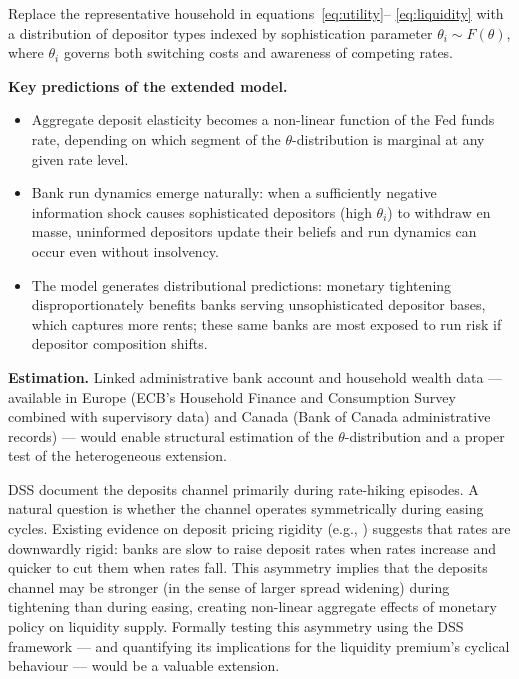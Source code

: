 \documentclass[12pt,a4paper]{article}
\begin{document}
\begin{extbox}
Replace the representative household in equations~\eqref{eq:utility}--
\eqref{eq:liquidity} with a distribution of depositor types indexed by
sophistication parameter $\theta_i \sim F(\theta)$, where $\theta_i$ governs
both switching costs and awareness of competing rates.

\textbf{Key predictions of the extended model.}
\begin{itemize}
  \item Aggregate deposit elasticity becomes a non-linear function of the Fed
    funds rate, depending on which segment of the $\theta$-distribution is
    marginal at any given rate level.
  \item Bank run dynamics emerge naturally: when a sufficiently negative
    information shock causes sophisticated depositors (high $\theta_i$) to
    withdraw en masse, uninformed depositors update their beliefs and run
    dynamics can occur even without insolvency.
  \item The model generates distributional predictions: monetary tightening
    disproportionately benefits banks serving unsophisticated depositor bases,
    which captures more rents; these same banks are most exposed to run risk
    if depositor composition shifts.
\end{itemize}

\textbf{Estimation.} Linked administrative bank account and household wealth
data --- available in Europe (ECB's Household Finance and Consumption Survey
combined with supervisory data) and Canada (Bank of Canada administrative
records) --- would enable structural estimation of the $\theta$-distribution
and a proper test of the heterogeneous extension.
\end{extbox}

\begin{extbox}
DSS document the deposits channel primarily during rate-hiking episodes. A
natural question is whether the channel operates symmetrically during easing
cycles. Existing evidence on deposit pricing rigidity (e.g., \citealt{hannan_berger_1991}) suggests that rates are downwardly rigid: banks
are slow to raise deposit rates when rates increase and quicker to cut them
when rates fall. This asymmetry implies that the deposits channel may be
stronger (in the sense of larger spread widening) during tightening than
during easing, creating non-linear aggregate effects of monetary policy on
liquidity supply. Formally testing this asymmetry using the DSS framework ---
and quantifying its implications for the liquidity premium's cyclical
behaviour --- would be a valuable extension.
\end{extbox}
\end{document}
